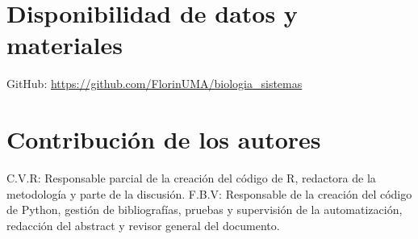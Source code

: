 \documentclass{bmcart}
\begin{document}
	\begin{backmatter}
	
		
		\section*{Disponibilidad de datos y materiales}%
			GitHub: \url{https://github.com/FlorinUMA/biologia_sistemas}
		
		\section*{Contribución de los autores}
			C.V.R: Responsable parcial de la creación del código de R, redactora de la metodología y parte de la discusión.
			F.B.V: Responsable de la creación del código de Python, gestión de bibliografías, pruebas y supervisión de la automatización, redacción del abstract y revisor general del documento.
		
		
		
	
	\end{backmatter}
\end{document}
